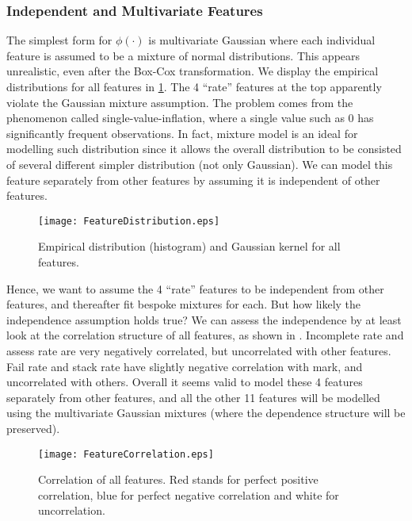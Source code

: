 \subsubsection{Independent and Multivariate Features}

The simplest form for $\phi(\cdot)$ is multivariate Gaussian where each individual feature is assumed to be a mixture of normal distributions. This appears unrealistic, even after the Box-Cox transformation. We display the empirical distributions for all features in \ref{fig:featureDistribution}. The 4 ``rate'' features at the top apparently violate the Gaussian mixture assumption. The problem comes from the phenomenon called	single-value-inflation, where a single value such as 0 has significantly frequent observations. In fact, mixture model is an ideal for modelling such distribution since it allows the overall distribution to be consisted of several different simpler distribution (not only Gaussian). We can model this feature separately from other features by assuming it is independent of other features.

\begin{figure}[!h]
\centering
\texttt{[image: FeatureDistribution.eps]}
\caption{Empirical distribution (histogram) and Gaussian kernel for all features.}
\label{fig:featureDistribution}
\end{figure}

Hence, we want to assume the 4 ``rate'' features to be independent from other features, and thereafter fit bespoke mixtures for each. But how likely the independence assumption holds true? We can assess the independence by at least look at the correlation structure of all features, as shown in . Incomplete rate and assess rate are very negatively correlated, but uncorrelated with other features. Fail rate and stack rate have slightly negative correlation with mark, and uncorrelated with others. Overall it seems valid to model these 4 features separately from other features, and all the other 11 features will be modelled using the multivariate Gaussian mixtures (where the dependence structure will be preserved).

\begin{figure}[!h]
\centering
\texttt{[image: FeatureCorrelation.eps]}
\caption{Correlation of all features. Red stands for perfect positive correlation, blue for perfect negative correlation and white for uncorrelation.}
\label{fig:featureCorrelation}
\end{figure}

